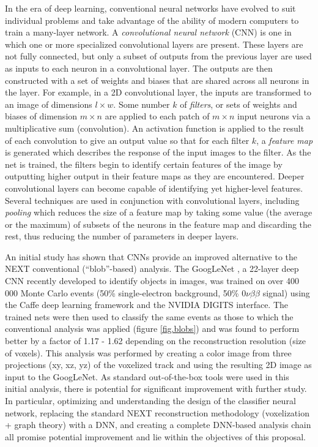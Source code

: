 \documentclass[11pt,a4paper]{article}
\begin{document}
In the era of deep learning, conventional neural networks have evolved to suit individual problems and take advantage of the ability of modern computers to train a many-layer network. A \emph{convolutional neural network} (CNN) is one in which one or more specialized convolutional layers are present. These layers are not fully connected, but only a subset of outputs from the previous layer are used as inputs to each neuron in a convolutional layer. The outputs are then constructed with a set of weights and biases that are shared across all neurons in the layer. For example, in a 2D convolutional layer, the inputs are transformed to an image of dimensions $l \times w$. Some number $k$ of \emph{filters}, or sets of weights and biases of dimension $m \times n$ are applied to each patch of $m \times n$ input neurons via a multiplicative sum (convolution). An activation function is applied to the result of each convolution to give an output value so that for each filter $k$, a \emph{feature map} is generated which describes the response of the input images to the filter. As the net is trained, the filters begin to identify certain features of the image by outputting higher output in their feature maps as they are encountered. Deeper convolutional layers can become capable of identifying yet higher-level features. Several techniques are used in conjunction with convolutional layers, including \emph{pooling} which reduces the size of a feature map by taking some value (the average or the maximum) of subsets of the neurons in the feature map and discarding the rest, thus reducing the number of parameters in deeper layers. 

An initial study \cite{NEXT_DNN} has shown that CNNs provide an improved alternative to the NEXT conventional (``blob''-based) analysis. The GoogLeNet \cite{Googlenet}, a 22-layer deep CNN recently developed to identify objects in images, was trained on over 400 000 Monte Carlo events (50\% single-electron background, 50\% $0\nu\beta\beta$ signal) using the Caffe deep learning framework \cite{jia2014caffe} and the NVIDIA DIGITS \cite{DIGITS} interface. The trained nets were then used to classify the same events as those to which the conventional analysis was applied (figure \ref{fig.blobs}) and was found to perform better by a factor of 1.17 - 1.62 depending on the reconstruction resolution (size of voxels). This analysis was performed by creating a color image from three projections (xy, xz, yz) of the voxelized track and using the resulting 2D image as input to the GoogLeNet. As standard out-of-the-box tools were used in this initial analysis, there is potential for significant improvement with further study. In particular, optimizing and understanding the design of the classifier neural network, replacing the standard NEXT reconstruction methodology (voxelization + graph theory) with a DNN, and creating a complete DNN-based analysis chain all promise potential improvement and lie within the objectives of this proposal.
\end{document}
